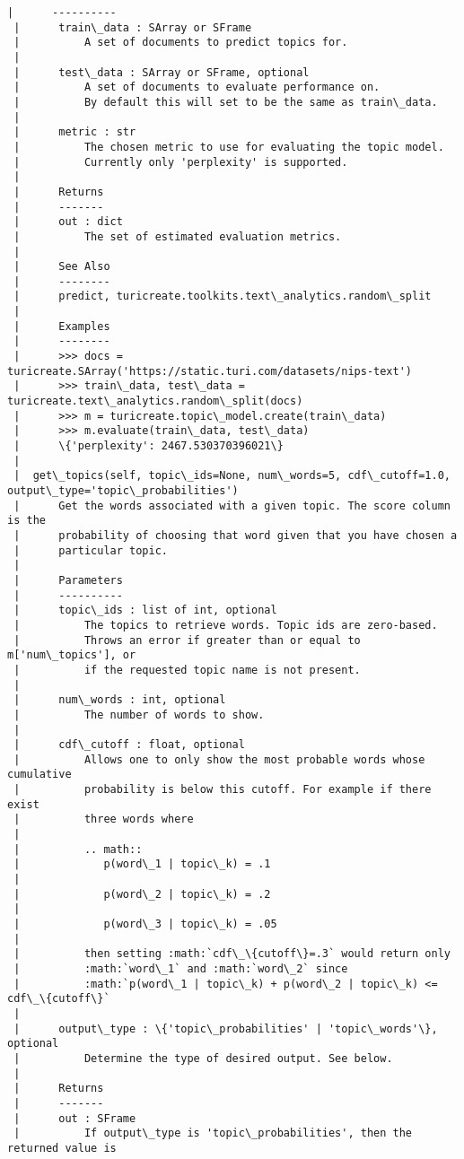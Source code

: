 \documentclass[11pt]{ctexart}
\begin{document}
\begin{Verbatim}[commandchars=\\\{\}]
 |      ----------
 |      train\_data : SArray or SFrame
 |          A set of documents to predict topics for.
 |      
 |      test\_data : SArray or SFrame, optional
 |          A set of documents to evaluate performance on.
 |          By default this will set to be the same as train\_data.
 |      
 |      metric : str
 |          The chosen metric to use for evaluating the topic model.
 |          Currently only 'perplexity' is supported.
 |      
 |      Returns
 |      -------
 |      out : dict
 |          The set of estimated evaluation metrics.
 |      
 |      See Also
 |      --------
 |      predict, turicreate.toolkits.text\_analytics.random\_split
 |      
 |      Examples
 |      --------
 |      >>> docs = turicreate.SArray('https://static.turi.com/datasets/nips-text')
 |      >>> train\_data, test\_data = turicreate.text\_analytics.random\_split(docs)
 |      >>> m = turicreate.topic\_model.create(train\_data)
 |      >>> m.evaluate(train\_data, test\_data)
 |      \{'perplexity': 2467.530370396021\}
 |  
 |  get\_topics(self, topic\_ids=None, num\_words=5, cdf\_cutoff=1.0, output\_type='topic\_probabilities')
 |      Get the words associated with a given topic. The score column is the
 |      probability of choosing that word given that you have chosen a
 |      particular topic.
 |      
 |      Parameters
 |      ----------
 |      topic\_ids : list of int, optional
 |          The topics to retrieve words. Topic ids are zero-based.
 |          Throws an error if greater than or equal to m['num\_topics'], or
 |          if the requested topic name is not present.
 |      
 |      num\_words : int, optional
 |          The number of words to show.
 |      
 |      cdf\_cutoff : float, optional
 |          Allows one to only show the most probable words whose cumulative
 |          probability is below this cutoff. For example if there exist
 |          three words where
 |      
 |          .. math::
 |             p(word\_1 | topic\_k) = .1
 |      
 |             p(word\_2 | topic\_k) = .2
 |      
 |             p(word\_3 | topic\_k) = .05
 |      
 |          then setting :math:`cdf\_\{cutoff\}=.3` would return only
 |          :math:`word\_1` and :math:`word\_2` since
 |          :math:`p(word\_1 | topic\_k) + p(word\_2 | topic\_k) <= cdf\_\{cutoff\}`
 |      
 |      output\_type : \{'topic\_probabilities' | 'topic\_words'\}, optional
 |          Determine the type of desired output. See below.
 |      
 |      Returns
 |      -------
 |      out : SFrame
 |          If output\_type is 'topic\_probabilities', then the returned value is

\end{Verbatim}
\end{document}
